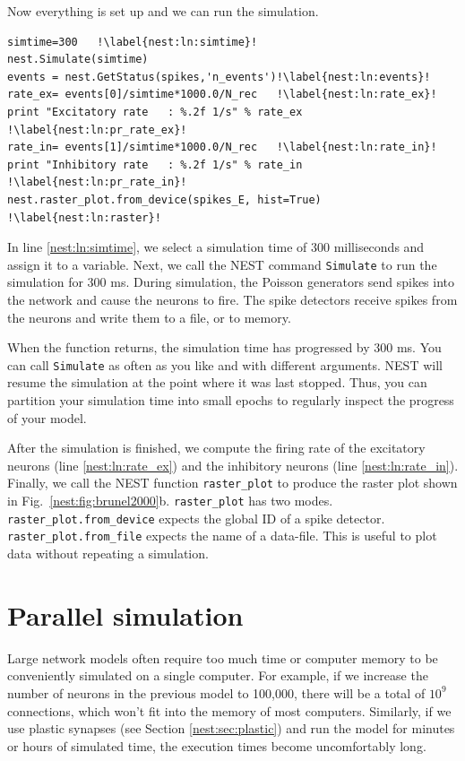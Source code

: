 \documentclass{article}
\begin{document}
Now everything is set up and we can run the simulation.

\begin{lstlisting}[name=Brunel_interactive]
simtime=300   !\label{nest:ln:simtime}!
nest.Simulate(simtime)
events = nest.GetStatus(spikes,'n_events')!\label{nest:ln:events}!
rate_ex= events[0]/simtime*1000.0/N_rec   !\label{nest:ln:rate_ex}!
print "Excitatory rate   : %.2f 1/s" % rate_ex !\label{nest:ln:pr_rate_ex}!
rate_in= events[1]/simtime*1000.0/N_rec   !\label{nest:ln:rate_in}!
print "Inhibitory rate   : %.2f 1/s" % rate_in !\label{nest:ln:pr_rate_in}!
nest.raster_plot.from_device(spikes_E, hist=True)  !\label{nest:ln:raster}!
\end{lstlisting}
In line \ref{nest:ln:simtime}, we select a simulation time of
300 milliseconds and assign it to a variable. Next, we call the NEST
command \lstinline!Simulate! to run the simulation for 300 ms. During
simulation, the Poisson generators send spikes into the network
and cause the neurons to fire. The spike detectors receive spikes
from the neurons and write them to a file, or to memory.

When the function returns, the simulation time has progressed by
300 ms. You can call \lstinline!Simulate! as often as you like and
with different arguments. NEST will resume the simulation at the point
where it was last stopped. Thus, you can partition your simulation time
into small epochs to regularly inspect the progress of your model.

After the simulation is finished, we compute the firing rate of the
excitatory neurons (line \ref{nest:ln:rate_ex}) and the inhibitory
neurons (line \ref{nest:ln:rate_in}). Finally, we call the NEST
function \lstinline!raster_plot! to produce the raster plot shown in
Fig.~\ref{nest:fig:brunel2000}b. \lstinline!raster_plot! has two
modes. \lstinline!raster_plot.from_device! expects the global ID of a
spike detector.  \lstinline!raster_plot.from_file! expects the name of
a data-file. This is useful to plot data without repeating a
simulation.


\section{Parallel simulation}\label{nest:sec:parallel}

Large network models often require too much time or computer memory to
be conveniently simulated on a single computer. For example, if we increase the number of
neurons in the previous model to 100,000, there will be a total of
$10^9$ connections, which won't fit into the memory of most computers.
Similarly, if we use plastic synapses (see Section
\ref{nest:sec:plastic}) and run the model for minutes or hours of
simulated time, the execution times become uncomfortably long.
 
\end{document}
